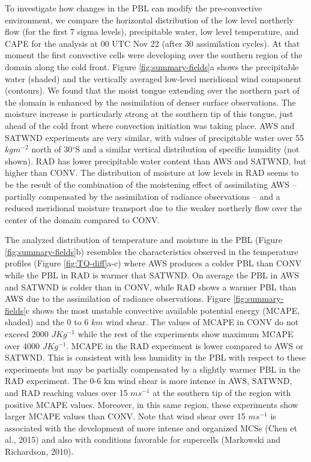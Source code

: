\documentclass[final,5p,times,twocolumn,authoryear]{elsarticle} %
\begin{document}
To investigate how changes in the PBL can modify the pre-convective environment, we compare the horizontal distribution of the low level northerly flow (for the first 7 sigma levels), precipitable water, low level temperature, and CAPE for the analysis at 00 UTC Nov 22 (after 30 assimilation cycles). At that moment the first convective cells were developing over the southern region of the domain along the cold front. Figure \ref{fig:summary-fields}a shows the precipitable water (shaded) and the vertically averaged low-level meridional wind component (contours). We found that the moist tongue extending over the northern part of the domain is enhanced by the assimilation of denser surface observations. The moisture increase is particularly strong at the southern tip of this tongue, just ahead of the cold front where convection initiation was taking place. AWS and SATWND experiments are very similar, with values of precipitable water over 55 \(kgm^{-2}\) north of 30\(^{\circ}\)S and a similar vertical distribution of specific humidity (not shown). RAD has lower precipitable water content than AWS and SATWND, but higher than CONV. The distribution of moisture at low levels in RAD seems to be the result of the combination of the moistening effect of assimilating AWS -- partially compensated by the assimilation of radiance observations -- and a reduced meridional moisture transport due to the weaker northerly flow over the center of the domain compared to CONV.

The analyzed distribution of temperature and moisture in the PBL (Figure \ref{fig:summary-fields}b) resembles the characteristics observed in the temperature profiles (Figure \ref{fig:TQ-diff}a-c) where AWS produces a colder PBL than CONV while the PBL in RAD is warmer that SATWND. On average the PBL in AWS and SATWND is colder than in CONV, while RAD shows a warmer PBL than AWS due to the assimilation of radiance observations. Figure \ref{fig:summary-fields}c shows the most unstable convective available potential energy (MCAPE, shaded) and the 0 to 6 \(km\) wind shear. The values of MCAPE in CONV do not exceed 2000 \(JKg^{-1}\) while the rest of the experiments show maximum MCAPE over 4000 \(JKg^{-1}\). MCAPE in the RAD experiment is lower compared to AWS or SATWND. This is consistent with less humidity in the PBL with respect to these experiments but may be partially compensated by a slightly warmer PBL in the RAD experiment. The 0-6 km wind shear is more intense in AWS, SATWND, and RAD reaching values over 15 \(ms^{-1}\) at the southern tip of the region with positive MCAPE values. Moreover, in this same region, these experiments show larger MCAPE values than CONV. Note that wind shear over 15 \(ms^{-1}\) is associated with the development of more intense and organized MCSs (Chen et al., 2015) and also with conditions favorable for supercells (Markowski and Richardson, 2010).
\end{document}
